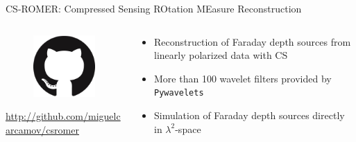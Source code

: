 \documentclass[xetex,aspectratio=169]{beamer}
\begin{document}
\begin{frame}{CS-ROMER: Compressed Sensing ROtation MEasure Reconstruction}
	\begin{columns}[onlytextwidth,t]
		\begin{column}{.5\textwidth}
			\begin{figure}
				\centering
				\includegraphics[scale=0.5]{figures/logos/GitHub-Mark-120px-plus.png}
			\end{figure}

			\url{http://github.com/miguelcarcamov/csromer}
		\end{column}
		\begin{column}{.5\textwidth}
			\begin{itemize}
				\item Reconstruction of Faraday depth sources from linearly polarized data with CS
				\item More than 100 wavelet filters provided by {\tt Pywavelets}
				\item Simulation of Faraday depth sources directly in $\lambda^2$-space

			\end{itemize}
		\end{column}%

	\end{columns}
\end{frame}
\end{document}
